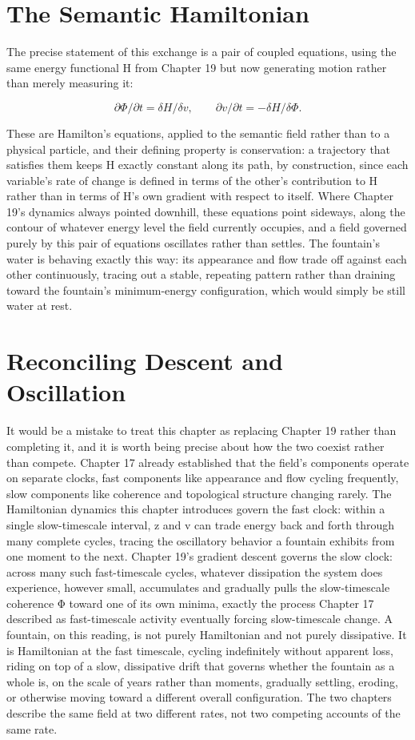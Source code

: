 \section{The Semantic Hamiltonian}

The precise statement of this exchange is a pair of coupled equations, using the same energy functional H from Chapter 19 but now generating motion rather than merely measuring it:

\[ \partial\Phi/\partial t = \delta H/\delta v, \qquad \partial v/\partial t = -\delta H/\delta\Phi. \]

These are Hamilton's equations, applied to the semantic field rather than to a physical particle, and their defining property is conservation: a trajectory that satisfies them keeps H exactly constant along its path, by construction, since each variable's rate of change is defined in terms of the other's contribution to H rather than in terms of H's own gradient with respect to itself. Where Chapter 19's dynamics always pointed downhill, these equations point sideways, along the contour of whatever energy level the field currently occupies, and a field governed purely by this pair of equations oscillates rather than settles. The fountain's water is behaving exactly this way: its appearance and flow trade off against each other continuously, tracing out a stable, repeating pattern rather than draining toward the fountain's minimum-energy configuration, which would simply be still water at rest.

\section{Reconciling Descent and Oscillation}

It would be a mistake to treat this chapter as replacing Chapter 19 rather than completing it, and it is worth being precise about how the two coexist rather than compete. Chapter 17 already established that the field's components operate on separate clocks, fast components like appearance and flow cycling frequently, slow components like coherence and topological structure changing rarely. The Hamiltonian dynamics this chapter introduces govern the fast clock: within a single slow-timescale interval, z and v can trade energy back and forth through many complete cycles, tracing the oscillatory behavior a fountain exhibits from one moment to the next. Chapter 19's gradient descent governs the slow clock: across many such fast-timescale cycles, whatever dissipation the system does experience, however small, accumulates and gradually pulls the slow-timescale coherence Φ toward one of its own minima, exactly the process Chapter 17 described as fast-timescale activity eventually forcing slow-timescale change. A fountain, on this reading, is not purely Hamiltonian and not purely dissipative. It is Hamiltonian at the fast timescale, cycling indefinitely without apparent loss, riding on top of a slow, dissipative drift that governs whether the fountain as a whole is, on the scale of years rather than moments, gradually settling, eroding, or otherwise moving toward a different overall configuration. The two chapters describe the same field at two different rates, not two competing accounts of the same rate.


